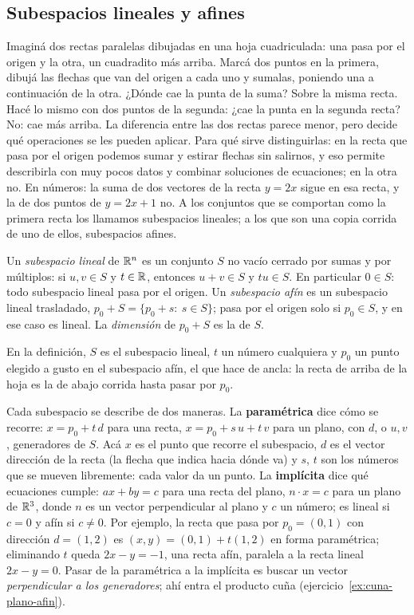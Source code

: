 \subsection{Subespacios lineales y afines}\label{sec:subespacios-lineales-afines}

Imaginá dos rectas paralelas dibujadas en una hoja cuadriculada: una pasa por el origen y la
otra, un cuadradito más arriba. Marcá dos puntos en la primera, dibujá las flechas que van
del origen a cada uno y sumalas, poniendo una a continuación de la otra. ¿Dónde cae la punta
de la suma?
Sobre la misma recta. Hacé lo mismo con dos puntos de la segunda: ¿cae la punta en la
segunda recta?
No: cae más arriba. La diferencia entre las dos rectas parece menor, pero decide qué
operaciones se les pueden aplicar. Para qué sirve distinguirlas: en la recta que pasa por el
origen podemos sumar y estirar flechas sin salirnos, y eso permite describirla con muy pocos
datos y combinar soluciones de ecuaciones; en la otra no. En números: la suma de dos vectores
de la recta \(y=2x\) sigue en esa recta, y la de dos puntos de \(y=2x+1\) no. A los conjuntos
que se comportan como la primera recta los llamamos subespacios lineales; a los que son una
copia corrida de uno de ellos, subespacios afines.

\begin{definicion}\label{def:subespacio}
Un \emph{subespacio lineal} de \(\mathbb{R}^n\) es un conjunto \(S\) no vacío cerrado por sumas y por
múltiplos: si \(u,v\in S\) y \(t\in\mathbb{R}\), entonces \(u+v\in S\) y \(tu\in S\). En particular
\(0\in S\): todo subespacio lineal pasa por el origen. Un \emph{subespacio afín} es un
subespacio lineal trasladado, \(p_0+S=\{p_0+s:\ s\in S\}\); pasa por el origen solo si
\(p_0\in S\), y en ese caso es lineal. La \emph{dimensión} de \(p_0+S\) es la de \(S\).
\end{definicion}

En la definición, \(S\) es el subespacio lineal, \(t\) un número cualquiera y \(p_0\) un punto
elegido a gusto en el subespacio afín, el que hace de ancla: la recta de arriba de la hoja
es la de abajo corrida hasta pasar por \(p_0\).

Cada subespacio se describe de dos maneras. La \textbf{paramétrica} dice cómo se recorre:
\(x=p_0+t\,d\) para una recta, \(x=p_0+s\,u+t\,v\) para un plano, con \(d\), o \(u,v\),
generadores de \(S\). Acá \(x\) es el punto que recorre el subespacio, \(d\) es el vector
dirección de la recta (la flecha que indica hacia dónde va) y \(s\), \(t\) son los números
que se mueven libremente: cada valor da un punto. La \textbf{implícita} dice qué ecuaciones
cumple: \(ax+by=c\) para una recta del plano, \(n\cdot x=c\) para un plano de \(\mathbb{R}^3\), donde
\(n\) es un vector perpendicular al plano y \(c\) un número; es lineal si \(c=0\) y afín si
\(c\neq0\). Por ejemplo, la recta que pasa por \(p_0=(0,1)\) con dirección \(d=(1,2)\) es
\((x,y)=(0,1)+t(1,2)\) en forma paramétrica; eliminando \(t\) queda \(2x-y=-1\), una recta
afín, paralela a la recta lineal \(2x-y=0\). Pasar de la paramétrica a la implícita es buscar
un vector \emph{perpendicular a los generadores}; ahí entra el producto cuña
(ejercicio~\ref{ex:cuna-plano-afin}).

